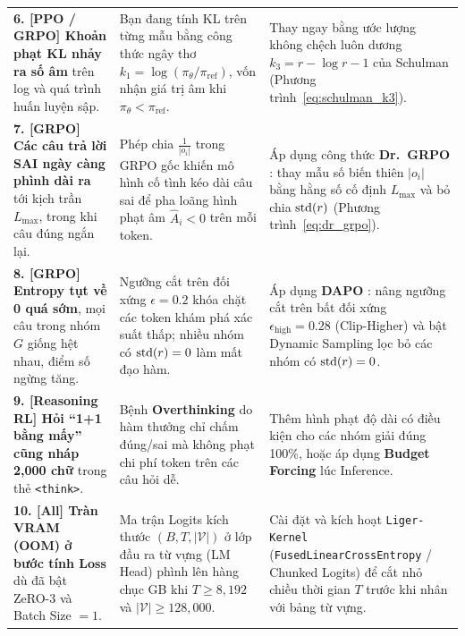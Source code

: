 \begin{table}[htbp]
\begin{tabularx}{\textwidth}{p{3.4cm} p{4.5cm} X}
\addlinespace
\textbf{6. [PPO / GRPO] Khoản phạt KL nhảy ra số âm} trên log và quá trình huấn luyện sập. & Bạn đang tính KL trên từng mẫu bằng công thức ngây thơ $k_1 = \log(\pi_\theta / \pi_{\text{ref}})$, vốn nhận giá trị âm khi $\pi_\theta < \pi_{\text{ref}}$. & Thay ngay bằng ước lượng không chệch luôn dương $k_3 = r - \log r - 1$ của Schulman (Phương trình~\ref{eq:schulman_k3}). \\
\addlinespace
\textbf{7. [GRPO] Các câu trả lời SAI ngày càng phình dài ra} tới kịch trần $L_{\max}$, trong khi câu đúng ngắn lại. & Phép chia $\frac{1}{|o_i|}$ trong GRPO gốc khiến mô hình cố tình kéo dài câu sai để pha loãng hình phạt âm $\hat{A}_i < 0$ trên mỗi token. & Áp dụng công thức \textbf{Dr.~GRPO} \citep{liu2025understanding}: thay mẫu số biến thiên $|o_i|$ bằng hằng số cố định $L_{\max}$ và bỏ chia $\operatorname{\mathrm{std}}(r)$ (Phương trình~\ref{eq:dr_grpo}). \\
\addlinespace
\textbf{8. [GRPO] Entropy tụt về 0 quá sớm}, mọi câu trong nhóm $G$ giống hệt nhau, điểm số ngừng tăng. & Ngưỡng cắt trên đối xứng $\epsilon = 0.2$ khóa chặt các token khám phá xác suất thấp; nhiều nhóm có $\operatorname{\mathrm{std}}(r) = 0$ làm mất đạo hàm. & Áp dụng \textbf{DAPO} \citep{yu2025dapo}: nâng ngưỡng cắt trên bất đối xứng $\epsilon_{\text{high}} = 0.28$ (Clip-Higher) và bật Dynamic Sampling lọc bỏ các nhóm có $\operatorname{\mathrm{std}}(r) = 0$. \\
\addlinespace
\textbf{9. [Reasoning RL] Hỏi ``1+1 bằng mấy'' cũng nháp 2,000 chữ} trong thẻ \texttt{<think>}. & Bệnh \textbf{Overthinking} \citep{chen2025donot} do hàm thưởng chỉ chấm đúng/sai mà không phạt chi phí token trên các câu hỏi dễ. & Thêm hình phạt độ dài có điều kiện cho các nhóm giải đúng 100\%, hoặc áp dụng \textbf{Budget Forcing} \citep{muennighoff2025s1} lúc Inference. \\
\addlinespace
\textbf{10. [All] Tràn VRAM (OOM) ở bước tính Loss} dù đã bật ZeRO-3 và Batch Size $= 1$. & Ma trận Logits kích thước $(B, T, |\mathcal{V}|)$ ở lớp đầu ra từ vựng (LM Head) phình lên hàng chục GB khi $T \ge 8{,}192$ và $|\mathcal{V}| \ge 128{,}000$. & Cài đặt và kích hoạt \texttt{Liger-Kernel} (\texttt{FusedLinearCrossEntropy} / Chunked Logits) để cắt nhỏ chiều thời gian $T$ trước khi nhân với bảng từ vựng. \\
\bottomrule
\end{tabularx}
\end{table}
